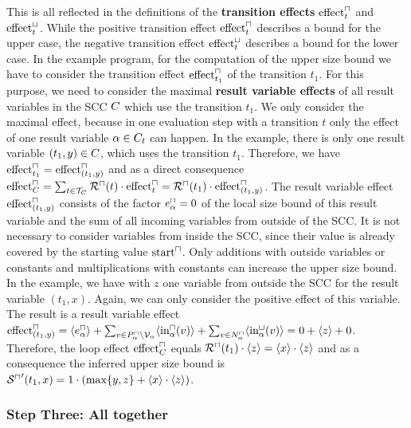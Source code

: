 This is all reflected in the definitions of the \textbf{transition effects} $\text{effect}^\sqcap_t$ and $\text{effect}^\sqcup_t$.
While the positive transition effect $\text{effect}^\sqcap_t$ describes a bound for the upper case, the negative transition effect $\text{effect}^\sqcup_t$ describes a bound for the lower case.
In the example program, for the computation of the upper size bound we have to consider the transition effect $\text{effect}^\sqcap_{t_1}$ of the transition $t_1$.
For this purpose, we need to consider the maximal \textbf{result variable effects} of all result variables in the SCC $C$ which use the transition $t_1$.
We only consider the maximal effect, because in one evaluation step with a transition $t$ only the effect of one result variable $\alpha \in C_t$ can happen.
In the example, there is only one result variable $(t_1,y) \in C$, which uses the transition $t_1$.
Therefore, we have $\text{effect}^\sqcap_{t_1} = \text{effect}^\sqcap_{(t_1,y)}$ and as a direct consequence $\text{effect}^\sqcap_C = \sum_{t \in \mathcal{T}_C} {\mathcal{R}^\sqcap}(t) \cdot \text{effect}^\sqcap_{t} = {\mathcal{R}^\sqcap}(t_1) \cdot \text{effect}^\sqcap_{(t_1,y)}$.
The result variable effect $\text{effect}^\sqcap_{(t_1,y)}$ consists of the factor $e^\sqcap_\alpha = 0$ of the local size bound of this result variable and the sum of all incoming variables from outside of the SCC.
It is not necessary to consider variables from inside the SCC, since their value is already covered by the starting value $\text{start}^\sqcap$.
Only additions with outside variables or constants and multiplications with constants can increase the upper size bound.
In the example, we have with $z$ one variable from outside the SCC for the result variable $(t_1,x)$.
Again, we can only consider the positive effect of this variable.
The result is a result variable effect $\text{effect}^\sqcap_{(t_1,y)} = \langle e^\sqcap_\alpha\rangle + \sum_{v \in P_\alpha^\sqcap \setminus \mathcal{V}_\alpha} \langle\text{in}^\sqcap_\alpha(v)\rangle + \sum_{v \in N_\alpha^\sqcap} \langle\text{in}^\sqcup_\alpha(v)\rangle = 0 + \langle z\rangle + 0$.
Therefore, the loop effect $\text{effect}^\sqcap_C$ equals ${\mathcal{R}^\sqcap}(t_1) \cdot \langle z\rangle = \langle x\rangle \cdot \langle z\rangle$ and as a consequence the inferred upper size bound is ${\mathcal{S}^\sqcap}'(t_1,x) = 1 \cdot (\max \lbrace y,z \rbrace + \langle x\rangle \cdot \langle z\rangle)$.

\subsubsection{Step Three: All together}

